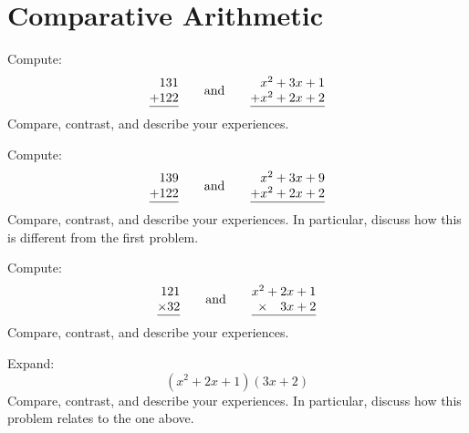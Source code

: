 \newpage
\section{Comparative Arithmetic}\label{A:CA}


\begin{prob} Compute:
\[
\begin{array}{@{}r@{}}
131\\
+122\\ \hline
\end{array}
\qquad\text{and}
\qquad
\begin{array}{@{}r@{}}
x^2+3x+1\\
+x^2+2x+2\\ \hline
\end{array}
\]
Compare, contrast, and describe your experiences.
\end{prob}

\begin{prob} Compute:
\[
\begin{array}{@{}r@{}}
139\\
+122\\ \hline
\end{array}
\qquad\text{and}
\qquad
\begin{array}{@{}r@{}}
x^2+3x+9\\
+x^2+2x+2\\ \hline
\end{array}
\]
Compare, contrast, and describe your experiences. In particular,
discuss how this is different from the first problem.
\end{prob}


\begin{prob} Compute:
\[
\begin{array}{@{}r@{}}
121\\
\times 32\\ \hline
\end{array}
\qquad\text{and}
\qquad
\begin{array}{@{}r@{}}
x^2+2x+1\\
\times~~~3x+2\\ \hline
\end{array}
\]
Compare, contrast, and describe your experiences.
\end{prob}

\begin{prob}
Expand:
\[
(x^2 + 2x + 1)(3x+2)
\]
Compare, contrast, and describe your experiences. In particular, discuss how this problem relates to the one above.
\end{prob}

